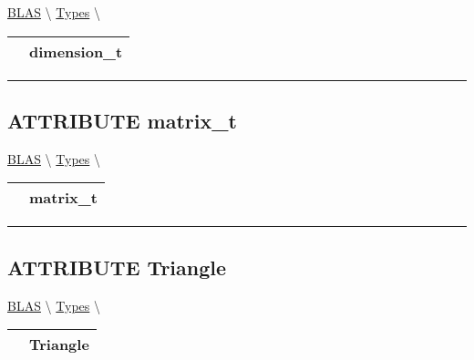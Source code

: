 \hypertarget{ecldoc:blas.types.dimension_t}{}
\hspace{0pt} \hyperlink{ecldoc:blas}{BLAS} \textbackslash 
\hspace{0pt} \hyperlink{ecldoc:BLAS.Types}{Types} \textbackslash 

{\renewcommand{\arraystretch}{1.5}
\begin{tabularx}{\textwidth}{|>{\raggedright\arraybackslash}l|X|}
\hline
\hspace{0pt}\mytexttt{\color{red} } & \textbf{dimension\_t} \\
\hline
\end{tabularx}
}

\par


\rule{\linewidth}{0.5pt}
\subsection*{\textsf{\colorbox{headtoc}{\color{white} ATTRIBUTE}
matrix\_t}}

\hypertarget{ecldoc:blas.types.matrix_t}{}
\hspace{0pt} \hyperlink{ecldoc:blas}{BLAS} \textbackslash 
\hspace{0pt} \hyperlink{ecldoc:BLAS.Types}{Types} \textbackslash 

{\renewcommand{\arraystretch}{1.5}
\begin{tabularx}{\textwidth}{|>{\raggedright\arraybackslash}l|X|}
\hline
\hspace{0pt}\mytexttt{\color{red} } & \textbf{matrix\_t} \\
\hline
\end{tabularx}
}

\par


\rule{\linewidth}{0.5pt}
\subsection*{\textsf{\colorbox{headtoc}{\color{white} ATTRIBUTE}
Triangle}}

\hypertarget{ecldoc:ecldoc-Triangle}{}
\hspace{0pt} \hyperlink{ecldoc:blas}{BLAS} \textbackslash 
\hspace{0pt} \hyperlink{ecldoc:BLAS.Types}{Types} \textbackslash 

{\renewcommand{\arraystretch}{1.5}
\begin{tabularx}{\textwidth}{|>{\raggedright\arraybackslash}l|X|}
\hline
\hspace{0pt}\mytexttt{\color{red} } & \textbf{Triangle} \\
\hline
\end{tabularx}
}


